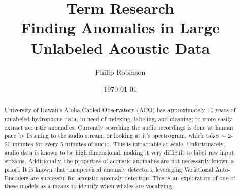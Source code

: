 \documentclass{article}
\title{Term Research \\ Finding Anomalies in Large Unlabeled Acoustic Data}
\date{\today}
\author{Philip Robinson}
\affil{Oregon Health Sciences University}
\begin{document}
\maketitle

\def\aa{acoustic anomalies\xspace}
\def\ae{Auto-Encoders\xspace}
\def\vae{Variational \ae\xspace}
\def\gumiho{Gumiho Network\xspace}
\def\condgen{Conditional Generating Network\xspace}
\def\desc{Descriminator Network\xspace}

\def\np{Neyman-Pearson Lemma\xspace}
\def\pdf{probability density function\xspace}
\def\fpr{false positive rate\xspace}
\def\tfpr{true/false positive rate\xspace}
\def\tpr{true positive rate\xspace}
\def\keras{\texttt{keras}\xspace}
\def\pytorch{\texttt{pytorch}\cite{paszke2017automatic}\xspace}
\def\tensorflow{\texttt{tensorflow}\xspace}
\def\ray{\texttt{ray}\xspace}

\def\encoder{\texttt{encoder}\xspace}
\def\decoder{\texttt{decoder}\xspace}
\def\bottle{\texttt{bottle}\xspace}
\def\GMM{\texttt{GMM}\xspace}



\begin{abstract}
University of Hawaii's Aloha Cabled Observatory (ACO) has approximately 10 years
of unlabeled hydrophone data, in need of indexing, labeling, and cleaning; to more
easily extract \aa.
Currently searching the audio recordings is done at human pace by listening
to the audio stream, or looking at it's spectrogram, which takes $\sim$ 2-20 minutes
for every 5 minutes of audio. This is intractable at scale.
Unfortunately, audio data is known to be high dimensional, making it
very difficult to label raw input streams. Additionally, the properties of
\aa are not necessarily known a priori. It is known that unsupervised anomaly detectors,
leveraging \vae are successful for acoustic anomaly detection\cite{Koizumi:2019:UDA:3282584.3301702}.
This is an exploration of one of these models as a means to identify when whales
are vocalizing.

\end{abstract}
\end{document}
